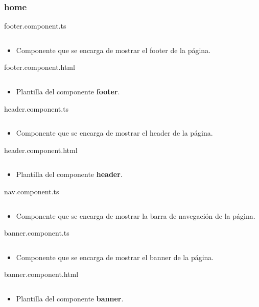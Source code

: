 \documentclass{article}
\newenvironment{block}{\captionsetup{type=listing}}{}
\begin{document}
\subsubsection{home}
\begin{block}
	\caption{footer.component.ts}
	\inputminted[breaklines]{TypeScript}{kioskios_web/src/app/home/footer/footer.component.ts}
	\begin{itemize}
		\item Componente que se encarga de mostrar el footer de la página.
	\end{itemize}

	\caption{footer.component.html}
	\inputminted[breaklines]{HTML}{kioskios_web/src/app/home/footer/footer.component.html}
	\begin{itemize}
		\item Plantilla del componente \textbf{footer}.
	\end{itemize}

	\caption{header.component.ts}
	\inputminted[breaklines]{TypeScript}{kioskios_web/src/app/home/header/header.component.ts}
	\begin{itemize}
		\item Componente que se encarga de mostrar el header de la página.
	\end{itemize}

	\caption{header.component.html}
	\inputminted[breaklines]{HTML}{kioskios_web/src/app/home/header/header.component.html}
	\begin{itemize}
		\item Plantilla del componente \textbf{header}.
	\end{itemize}

	\caption{nav.component.ts}
	\inputminted[breaklines]{TypeScript}{kioskios_web/src/app/home/nav/nav.component.ts}
	\begin{itemize}
		\item Componente que se encarga de mostrar la barra de navegación de la página.
	\end{itemize}

	\caption{banner.component.ts}
	\inputminted[breaklines]{TypeScript}{kioskios_web/src/app/home/banner/banner.component.ts}
	\begin{itemize}
		\item Componente que se encarga de mostrar el banner de la página.
	\end{itemize}

	\caption{banner.component.html}
	\inputminted[breaklines]{HTML}{kioskios_web/src/app/home/banner/banner.component.html}
	\begin{itemize}
		\item Plantilla del componente \textbf{banner}.
	\end{itemize}


\end{block}
\end{document}
